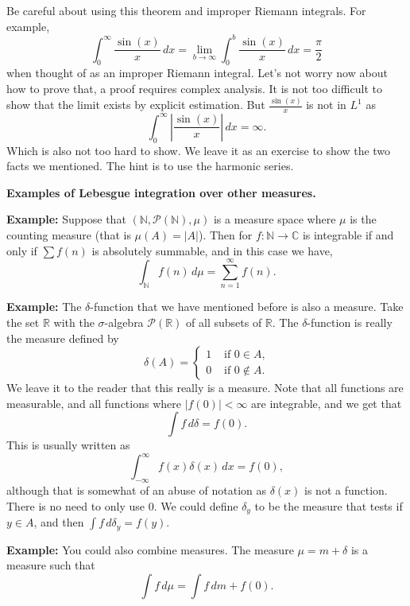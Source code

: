 \documentclass[12pt]{book}
\newcommand{\abs}[1]{\left\lvert {#1} \right\rvert}
\newcommand{\C}{{\mathbb{C}}}
\newcommand{\R}{{\mathbb{R}}}
\newcommand{\N}{{\mathbb{N}}}
\newcommand{\sP}{{\mathcal{P}}}
\theoremstyle{plain}
\theoremstyle{remark}
\theoremstyle{definition}
\theoremstyle{exercise}
\theoremstyle{example}
\begin{document}
\medskip

Be careful about using this theorem and improper Riemann integrals.  For
example,
$$
\int_{0}^\infty \frac{\sin(x)}{x} \, dx
= \lim_{b\to\infty}\int_{0}^b \frac{\sin(x)}{x} \, dx
= \frac{\pi}{2} 
$$
when thought of as an improper Riemann integral.  Let's not worry now about
how to prove that, a proof requires complex analysis.  It is not too
difficult to show that the limit exists by explicit estimation.  But 
$\frac{\sin(x)}{x}$ is not in $L^1$ as
$$
\int_{0}^\infty \abs{\frac{\sin(x)}{x}} \, dx = \infty.
$$
Which is also not too hard to show.  We leave it as an exercise to show the
two facts we mentioned.  The hint is to use the harmonic series.

\medskip

\textbf{Examples of Lebesgue integration over other measures.}
\nopagebreak

\medskip

\textbf{Example:}
Suppose that $(\N,\sP(\N),\mu)$ is a measure space where $\mu$
is the counting measure (that is $\mu(A) = \abs{A}$).  Then
for $f \colon \N \to \C$ is integrable if and only if
$\sum f(n)$ is absolutely summable, and in this case we have,
$$
\int_{\N} f(n) \, d\mu =
\sum_{n=1}^\infty f(n) .
$$

\medskip

\textbf{Example:}
The $\delta$-function that we have mentioned before is also a measure.
Take the set $\R$ with the $\sigma$-algebra $\sP(\R)$ of all
subsets of $\R$.
The $\delta$-function is really the measure
defined by
$$
\delta(A) =
\begin{cases}
1 & \text{ if $0 \in A$,} \\
0 & \text{ if $0 \notin A$.}
\end{cases} 
$$
We leave it to the reader that this really is a measure.  Note that
all functions are measurable, and all functions where $\abs{f(0)} < \infty$
are integrable, and we get that
$$
\int f\, d\delta = f(0) .
$$
This is usually written as
$$
\int_{-\infty}^\infty f(x) \delta(x) \, dx = f(0) ,
$$
although that is somewhat of an abuse of notation as $\delta(x)$
is not a function.
There is no need to only use $0$.  We could define $\delta_y$ to be the
measure that tests if $y \in A$, and then
$\int f \, d\delta_y = f(y)$.

\medskip

\textbf{Example:}
You could also combine measures.  The measure $\mu = m + \delta$
is a measure such that
$$
\int f \, d\mu = \int f \, dm + f(0) .
$$
\end{document}

